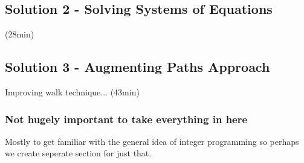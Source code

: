 \documentclass{article}
\begin{document}
\subsection*{Solution 2 - Solving Systems of Equations}
(28min)

\subsection*{Solution 3 - Augmenting Paths Approach}
Improving walk technique... (43min)

\subsubsection*{Not hugely important to take everything in here}
Mostly to get familiar with the general idea of integer programming so perhaps we create seperate section for just that.
\end{document}
